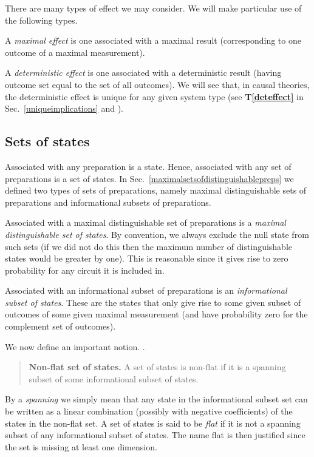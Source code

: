 \documentclass[10pt]{article}
\begin{document}
There are many types of effect we may consider.  We will make particular use of the following types.

A \emph{maximal effect} is one associated with a maximal result (corresponding to one outcome of a maximal measurement).

A \emph{deterministic effect} is one associated with a deterministic result (having outcome set equal to the set of all outcomes).  We will see that, in causal theories, the deterministic effect is unique for any given system type (see {\bf T\ref{deteffect}} in Sec.\ \ref{uniqueimplications} and \cite{chiribella2010probabilistic}).

\subsection{Sets of states}

Associated with any preparation is a state.  Hence, associated with any set of preparations is a set of states.  In Sec.\ \ref{maximalsetsofdistinguishablepreps} we defined two types of sets of preparations, namely maximal distinguishable sets of preparations and informational subsets of preparations.

Associated with a maximal distinguishable set of preparations is a \emph{maximal distinguishable set of states}. By convention, we always exclude the null state from such sets (if we did not do this then the maximum number of distinguishable states would be greater by one). This is reasonable since it gives rise to zero probability for any circuit it is included in.

Associated with an informational subset of preparations is an \emph{informational subset of states}.  These are the states that only give rise to some given subset of outcomes of some given maximal measurement (and have probability zero for the complement set of outcomes).

We now define an important notion.  .
\begin{quote}
{\bf Non-flat set of states.} A set of states is non-flat if it is a spanning subset of some informational subset of states.
\end{quote}
By a \emph{spanning} we simply mean that any state in the informational subset set can be written as a linear combination (possibly with negative coefficients) of the states in the non-flat set.  A set of states is said to be \emph{flat}  if it is not a spanning subset of any informational subset of states. The name flat is then justified since the set is missing at least one dimension.
\end{document}

